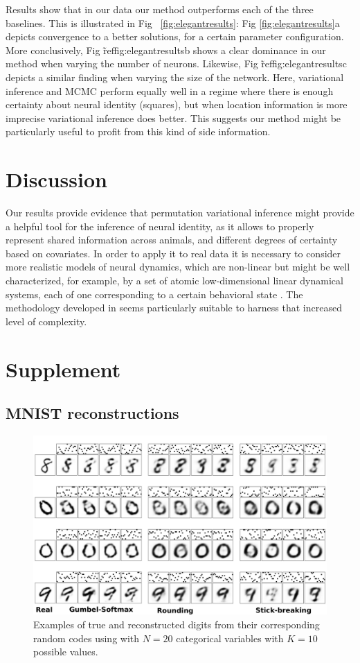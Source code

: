 \documentclass[twoside]{article}
\begin{document}
Results show that in our data our method outperforms each of the three baselines. This is illustrated in Fig ~\ref{fig:elegantresults}: Fig \ref{fig:elegantresults}a depicts convergence to a better solutions, for a certain parameter configuration. More conclusively, Fig \~ref{fig:elegantresults}b shows a clear dominance in our method when varying the number of neurons. Likewise, Fig \~ref{fig:elegantresults}c depicts a similar finding when varying the size of the network. Here, variational inference and MCMC perform equally well in a regime where there is enough certainty about neural identity (squares), but when location information is more imprecise variational inference does better. This suggests our method might be particularly useful to  profit from this kind of side information. 


\section{Discussion}
Our results provide evidence that permutation variational inference might provide a helpful tool for the inference of neural identity, as it allows to properly represent shared information across animals, and different degrees of certainty based on covariates. In order to apply it to real data it is necessary to consider more realistic models of neural dynamics, which are non-linear but might be well characterized, for example, by a set of atomic low-dimensional linear dynamical systems, each of one corresponding to a certain behavioral state  \cite{Kato2015}. The methodology developed in \cite{Linderman2016} seems particularly suitable to harness that increased level of complexity. \



\pagebreak 
\appendix
\section*{Supplement}
\subsection*{MNIST reconstructions}
\begin{figure}[t]
  \centering
  \includegraphics[width=5.in]{../figures/figure4.pdf} 
  \caption{Examples of true and reconstructed digits from their corresponding random codes using with $N=20$ categorical variables with $K=10$ possible values.
  }
\label{fig:synthetic}
\end{figure}
\end{document}

